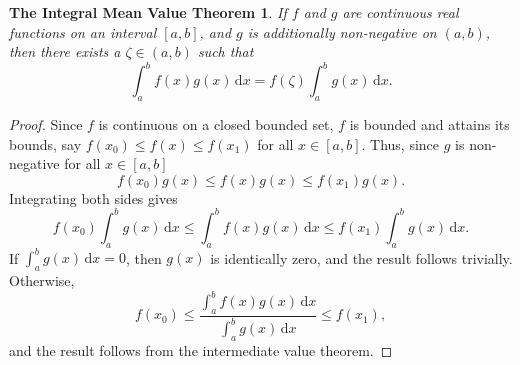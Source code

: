 \documentclass[12pt]{article}
\newcommand{\integral}[4]{\int_{#1}^{#2}\!{#3}\,\mathrm{d}{#4}}
\begin{document}
\newtheorem*{imvt}{The Integral Mean Value Theorem}

\begin{imvt}
If $f$ and $g$ are continuous real functions on an interval $[a,b]$, and $g$ is additionally non-negative on $(a,b)$, then there exists a $\zeta\in(a,b)$ such that
\[
  \integral{a}{b}{f(x)g(x)}{x}=f(\zeta)\integral{a}{b}{g(x)}{x}
.\]
\end{imvt}

\begin{proof}
Since $f$ is continuous on a closed bounded set, $f$ is bounded and attains its bounds, say $f\left(x_0\right)\leq f(x)\leq f\left(x_1\right)$ for all $x\in[a,b]$. Thus, since $g$ is non-negative for all $x\in[a,b]$
\[
  f\left(x_0\right)g(x)\leq f(x)g(x)\leq f\left(x_1\right)g(x)
.\]
Integrating both sides gives
\[
  f\left(x_0\right)\integral{a}{b}{g(x)}{x}\leq\integral{a}{b}{f(x)g(x)}{x}\leq f\left(x_1\right)\integral{a}{b}{g(x)}{x}
.\]
If $\integral{a}{b}{g(x)}{x}=0$, then $g(x)$ is identically zero, and the result follows trivially. Otherwise,
\[
  f\left(x_0\right)\leq\frac{\integral{a}{b}{f(x)g(x)}{x}}{\integral{a}{b}{g(x)}{x}}\leq f\left(x_1\right)
,\]
and the result follows from the intermediate value theorem.
\end{proof}
\end{document}

